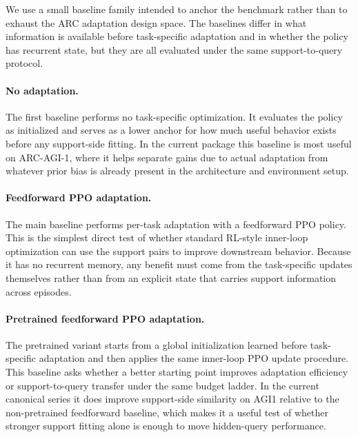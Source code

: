 %
%

We use a small baseline family intended to anchor the benchmark rather than to exhaust the ARC adaptation design space. The baselines differ in what information is available before task-specific adaptation and in whether the policy has recurrent state, but they are all evaluated under the same support-to-query protocol.

\paragraph{No adaptation.} The first baseline performs no task-specific optimization. It evaluates the policy as initialized and serves as a lower anchor for how much useful behavior exists before any support-side fitting. In the current package this baseline is most useful on ARC-AGI-1, where it helps separate gains due to actual adaptation from whatever prior bias is already present in the architecture and environment setup.

\paragraph{Feedforward PPO adaptation.} The main baseline performs per-task adaptation with a feedforward PPO policy. This is the simplest direct test of whether standard RL-style inner-loop optimization can use the support pairs to improve downstream behavior. Because it has no recurrent memory, any benefit must come from the task-specific updates themselves rather than from an explicit state that carries support information across episodes.

\paragraph{Pretrained feedforward PPO adaptation.} The pretrained variant starts from a global initialization learned before task-specific adaptation and then applies the same inner-loop PPO update procedure. This baseline asks whether a better starting point improves adaptation efficiency or support-to-query transfer under the same budget ladder. In the current canonical series it does improve support-side similarity on AGI1 relative to the non-pretrained feedforward baseline, which makes it a useful test of whether stronger support fitting alone is enough to move hidden-query performance.

